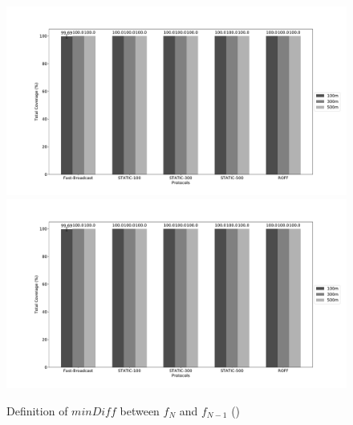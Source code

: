 		\begin{figure}[H]
			\centering
			\includegraphics[width=1.1\textwidth]{../../scripts/graphs/out/Platoon-15km/b0/j0-cw[32-1024]/totCoverage}
%	
			\includegraphics[width=1.1\textwidth]{../../scripts/graphs/out/Platoon-15km/b0/j0-cw[32-1024]/totCoverage}
			\caption{Definition of $minDiff$ between $f_N$ and $f_{N-1}$ (\cite{6906275})}
			\label{fig:minDiff}
			

\end{figure}
